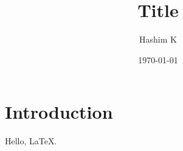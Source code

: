 \documentclass[11pt]{article}
\title{Title}
\author{Hashim K}
\date{\today}
\theoremstyle{definition}
\begin{document}
\maketitle

\section{Introduction}

Hello, \LaTeX.
\end{document}
